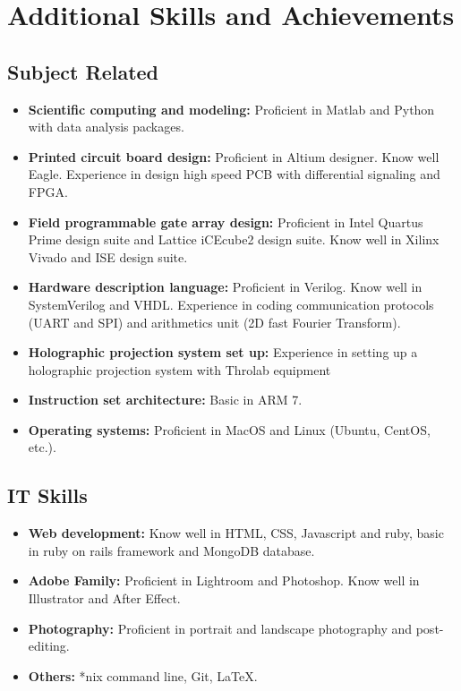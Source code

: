 \documentclass[11pt,a4paper,roman]{moderncv}        %
\begin{document}
\section{Additional Skills and Achievements}
\subsection{Subject Related}
\begin{itemize}
	\item \textbf{Scientific computing and modeling:} Proficient in Matlab and Python with data analysis packages.
	\item \textbf{Printed circuit board design:} Proficient in Altium designer. Know well Eagle. Experience in design high speed PCB with differential signaling and FPGA.
	\item \textbf{Field programmable gate array design:} Proficient in Intel Quartus Prime design suite and Lattice iCEcube2 design suite. Know well in Xilinx Vivado and ISE design suite.
	\item \textbf{Hardware description language:} Proficient in Verilog. Know well in SystemVerilog and VHDL. Experience in coding communication protocols (UART and SPI) and arithmetics unit (2D fast Fourier Transform).
	\item \textbf{Holographic projection system set up:} Experience in setting up a holographic projection system with Throlab equipment
	\item \textbf{Instruction set architecture:} Basic in ARM 7.
	\item \textbf{Operating systems:} Proficient in MacOS and Linux (Ubuntu, CentOS, etc.).
\end{itemize}
\subsection{IT Skills}
\begin{itemize}
	\item \textbf{Web development:} Know well in HTML, CSS, Javascript and ruby, basic in ruby on rails framework and MongoDB database.
	\item \textbf{Adobe Family:} Proficient in Lightroom and Photoshop. Know well in Illustrator and After Effect.
	\item \textbf{Photography:} Proficient in portrait and landscape photography and post-editing.
	\item \textbf{Others:} *nix command line, Git, \LaTeX.
\end{itemize}
\end{document}
